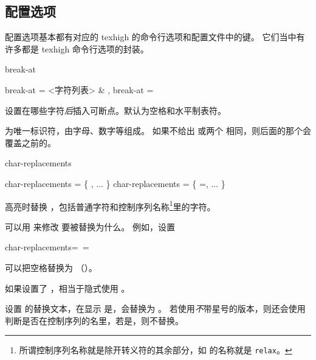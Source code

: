 \documentclass[class=article,openany]{cusdoc}[2025/09/29]
\begin{document}
\subsection{配置选项}

配置选项基本都有对应的 texhigh 的命令行选项和配置文件中的键。
它们当中有许多都是 texhigh 命令行选项的封装。

\begin{keyval}[path=high]{break-at}
  \begin{syntax}
    break-at = <{字符列表}> & \V{\\\ }, 
    break-at =  
  \end{syntax}
设置在哪些字符\emph{后}插入可断点。默认为空格和水平制表符。

 为唯一标识符，由字母、数字等组成。
如果不给出  或两个  相同，则后面的那个会覆盖之前的。
\end{keyval}

\begin{keyval}[path=high]{char-replacements}
  \begin{syntax}
    char-replacements = \V\{ , ... \V\}
    char-replacements = \V\{ =, ... \V\}
  \end{syntax}
高亮时替换 ，包括普通字符和控制序列名称\footnote{所谓控制序列名称就是除开转义符的其余部分，如  的名称就是 \texttt{relax}。}里的字符。

可以用  来修改  要被替换为什么。
例如，设置
\begin{thverbatim}
  char-replacements={\ =\textvisiblespace}
\end{thverbatim}
可以把空格替换为 \texttt{\textvisiblespace}（）。

如果设置了 ，相当于隐式使用 。
\end{keyval}

\begin{function}{\THSetCharReplacement}
  \begin{syntax}
    \V\THSetCharReplacement   {} 
    \V\THSetCharReplacement *  
  \end{syntax}
设置  的替换文本，在显示  是，会替换为 。
若使用\emph{不}带星号的版本，则还会使用  判断是否在控制序列的名里，若是，则不替换。
\end{function}
\end{document}
